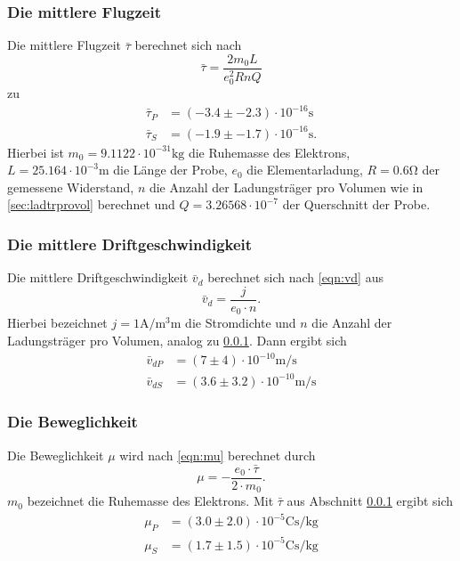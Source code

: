     \subsubsection{Die mittlere Flugzeit}
    \label{sec:mitflugz}
      Die mittlere Flugzeit $\bar{\tau}$ berechnet sich nach
      \begin{equation*}
        \bar{\tau} = \frac{2m_{0}L}{e_{0}^{2}RnQ}
      \end{equation*}
      zu
      \begin{align*}
        \bar{\tau}_{P} & = (-3.4 \pm -2.3) \cdot 10^{-16} \si{\second} \\
        \bar{\tau}_{S} & = (-1.9 \pm -1.7) \cdot 10^{-16} \si{\second}.
      \end{align*}
      Hierbei ist $m_{0} = 9.1122 \cdot 10^{-31} \si{\kilo\gram}$ die Ruhemasse des Elektrons, $L = 25.164 \cdot 10^{-3} \si{\meter}$ die Länge der Probe,
      $e_{0}$ die Elementarladung, $R = 0.6 \si{\ohm}$ der gemessene Widerstand, $n$ die Anzahl der Ladungsträger pro Volumen wie in \ref{sec:ladtrprovol} berechnet
      und $Q = 3.26568 \cdot 10^{-7}$ der Querschnitt der Probe.
    \subsubsection{Die mittlere Driftgeschwindigkeit}
      Die mittlere Driftgeschwindigkeit $\bar{v}_d$ berechnet sich nach \ref{eqn:vd} aus
      \begin{equation}
        \bar{v}_d = \frac{j}{e_{0} \cdot n}.
      \end{equation}
      Hierbei bezeichnet $j = 1 \si{\ampere\per\cubic\milli\meter}$ die Stromdichte und $n$ die Anzahl der Ladungsträger pro Volumen, analog zu \ref{sec:mitflugz}.
      Dann ergibt sich
      \begin{align*}
        \bar{v}_{dP} & = (7 \pm 4) \cdot 10^{-10} \si{\meter\per\second} \\
        \bar{v}_{dS} & = (3.6 \pm 3.2) \cdot 10^{-10} \si{\meter\per\second}
      \end{align*}
    \subsubsection{Die Beweglichkeit}
      Die Beweglichkeit $\mu$ wird nach \ref{eqn:mu} berechnet durch
      \begin{equation}
        \mu = -\frac{e_{0} \cdot \bar{\tau}}{2 \cdot m_{0}}.
      \end{equation}
      $m_{0}$ bezeichnet die Ruhemasse des Elektrons. Mit $\bar{\tau}$ aus Abschnitt \ref{sec:mitflugz} ergibt sich
      \begin{align*}
        \mu_{P} & = (3.0 \pm 2.0) \cdot 10^{-5} \si{\coulomb\second\per\kilo\gram}\\
        \mu_{S} & = (1.7 \pm 1.5) \cdot 10^{-5} \si{\coulomb\second\per\kilo\gram}
      \end{align*}
